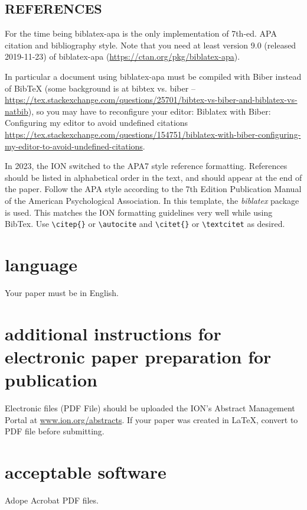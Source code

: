 \documentclass[letterpaper,times]{IONconf}
\begin{document}
\subsection{REFERENCES}

For the time being biblatex-apa is the only implementation of 7th-ed. APA citation and bibliography style. Note that you need at least version 9.0 (released 2019-11-23) of biblatex-apa (\url{https://ctan.org/pkg/biblatex-apa}).

In particular a document using biblatex-apa must be compiled with Biber instead of BibTeX (some background is at bibtex vs. biber  -- \url{https://tex.stackexchange.com/questions/25701/bibtex-vs-biber-and-biblatex-vs-natbib}), so you may have to reconfigure your editor:
Biblatex with Biber: Configuring my editor to avoid undefined citations
\url{https://tex.stackexchange.com/questions/154751/biblatex-with-biber-configuring-my-editor-to-avoid-undefined-citations}.


In 2023, the ION switched to the APA7 style reference formatting. References should be listed in alphabetical order in the text, and should appear at the end of the paper. Follow the APA style according to the 7th Edition Publication Manual of the American Psychological Association.
In this template, the \textit{biblatex} package is used. This matches the ION formatting guidelines very well while using BibTex.
Use \verb|\citep{}| or \verb|\autocite| and \verb|\citet{}| or \verb|\textcitet| as desired.

\section{language}

Your paper must be in English.

\section{additional instructions for electronic paper preparation for publication}

Electronic files (PDF File) should be uploaded the ION’s Abstract Management Portal at \url{www.ion.org/abstracts}. If your paper was created in \LaTeX, convert to PDF file before submitting.


\section{acceptable software}

Adope Acrobat PDF files.
\end{document}
